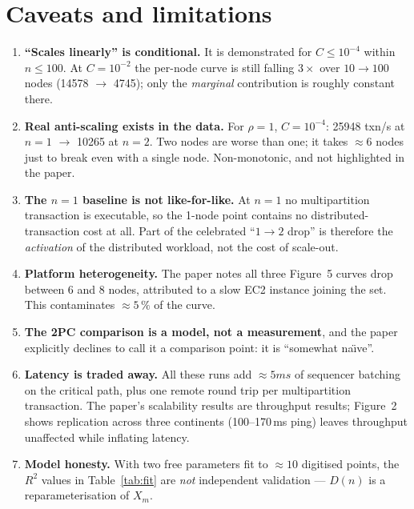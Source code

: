 \documentclass[11pt,a4paper]{article}
\newcommand{\hot}{C}
\newcommand{\pernode}{X_m}
\begin{document}
\section{Caveats and limitations}
\label{sec:caveats}

\begin{enumerate}[leftmargin=1.6em,itemsep=3pt]
\item \textbf{``Scales linearly'' is conditional.} It is demonstrated for
      $\hot\le10^{-4}$ within $n\le100$. At $\hot=10^{-2}$ the per-node
      curve is still falling $3\times$ over $10\to100$ nodes
      (\num{14578} $\to$ \num{4745}); only the \emph{marginal} contribution
      is roughly constant there.
\item \textbf{Real anti-scaling exists in the data.} For $\rho=1$,
      $\hot=10^{-4}$: \num{25948} txn/s at $n=1$ $\to$ \num{10265} at
      $n=2$. Two nodes are worse than one; it takes $\approx6$ nodes just to
      break even with a single node. Non-monotonic, and not highlighted in
      the paper.
\item \textbf{The $n=1$ baseline is not like-for-like.} At $n=1$ no
      multipartition transaction is executable, so the 1-node point contains
      no distributed-transaction cost at all. Part of the celebrated
      ``$1\to2$ drop'' is therefore the \emph{activation} of the distributed
      workload, not the cost of scale-out.
\item \textbf{Platform heterogeneity.} The paper notes all three Figure~5
      curves drop between 6 and 8 nodes, attributed to a slow EC2 instance
      joining the set. This contaminates $\approx5\,\%$ of the curve.
\item \textbf{The 2PC comparison is a model, not a measurement}, and the
      paper explicitly declines to call it a comparison point: it is
      ``somewhat na\"{\i}ve''.
\item \textbf{Latency is traded away.} All these runs add
      $\approx\si{5} ms$ of sequencer batching on the critical path, plus
      one remote round trip per multipartition transaction. The paper's
      scalability results are throughput results; Figure~2 shows replication
      across three continents (100--170\,ms ping) leaves throughput
      unaffected while inflating latency.
\item \textbf{Model honesty.} With two free parameters fit to $\approx10$
      digitised points, the $R^2$ values in Table~\ref{tab:fit} are \emph{not}
      independent validation --- $D(n)$ is a reparameterisation of $\pernode$.

\end{enumerate}
\end{document}
